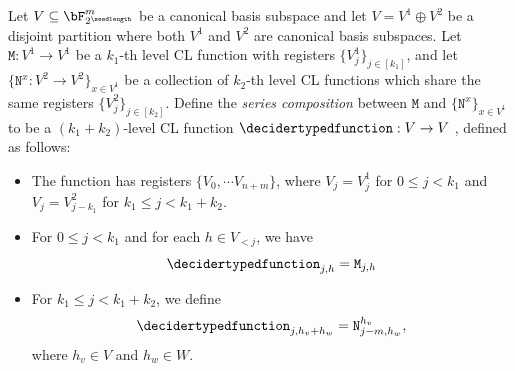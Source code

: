 \begin{definition} \label{defn:seriescomposCLfn}
		Let $V\subseteq \bF_{2^\seedlength}^m$ be a canonical basis subspace and let $V = V^1 \oplus V^2$ be a disjoint partition where both $V^1$ and $V^2$ are canonical basis subspaces. Let $\mathtt{M}: V^1 \rightarrow V^1$ be a $k_1$-th level CL function with registers $\{V_j^1\}_{j \in [k_1]}$, and let $\{ \mathtt{N}^x:  V^2 \rightarrow  V^2 \}_{x \in V^1}$ be a collection of $k_2$-th level CL functions which share the same registers $\{V^2_j\}_{j \in [k_2]}$.	Define the \textit{series composition} between $\mathtt{M}$ and $\{ \mathtt{N}^x \}_{x \in V^1}$ to be a  $(k_1 + k_2)$-level CL function $\decidertypedfunction: V \rightarrow V$ , defined as follows:
		\begin{itemize}
			\item The function has registers $\{V_0, \cdots V_{n+m} \}$, where $V_j = V^1_j$ for  $0 \leq j < k_1$ and $V_j = V^2_{j-k_1}$ for $k_1 \leq j < k_1+k_2$. 
			\item For $0 \leq j < k_1$ and for each $h \in V_{<j}$, we have 
			\begin{equation*}
				\decidertypedfunction_{j, h} = \mathtt{M}_{j, h}
			\end{equation*}
			\item For $k_1 \leq j < k_1+k_2$, we define 
			\begin{equation*}
				\decidertypedfunction_{j, h_v + h_w} = \mathtt{N}_{j-m, h_w}^{h_v},
			\end{equation*}
			where $h_v \in V$ and $h_w \in W$.
		\end{itemize}
\end{definition} 

